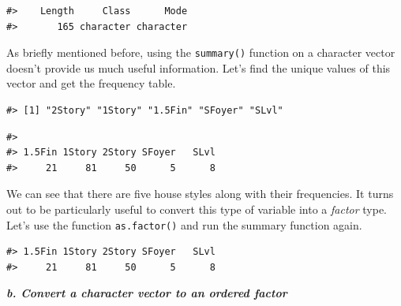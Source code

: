 \documentclass[
]{book}
\newenvironment{Shaded}{\begin{snugshade}}{\end{snugshade}}
\newcommand{\FunctionTok}[1]{\textcolor[rgb]{0.00,0.00,0.00}{#1}}
\newcommand{\NormalTok}[1]{#1}
\newcommand{\OtherTok}[1]{\textcolor[rgb]{0.56,0.35,0.01}{#1}}
\newcommand{\SpecialCharTok}[1]{\textcolor[rgb]{0.00,0.00,0.00}{#1}}
\begin{document}
\begin{verbatim}
#>    Length     Class      Mode 
#>       165 character character
\end{verbatim}

As briefly mentioned before, using the \texttt{summary()} function on a character vector doesn't provide us much useful information. Let's find the unique values of this vector and get the frequency table.

\begin{Shaded}
\end{Shaded}

\begin{verbatim}
#> [1] "2Story" "1Story" "1.5Fin" "SFoyer" "SLvl"
\end{verbatim}

\begin{Shaded}
\end{Shaded}

\begin{verbatim}
#> 
#> 1.5Fin 1Story 2Story SFoyer   SLvl 
#>     21     81     50      5      8
\end{verbatim}

We can see that there are five house styles along with their frequencies. It turns out to be particularly useful to convert this type of variable into a \emph{factor} type. Let's use the function \texttt{as.factor()} and run the summary function again.

\begin{Shaded}
\end{Shaded}

\begin{verbatim}
#> 1.5Fin 1Story 2Story SFoyer   SLvl 
#>     21     81     50      5      8
\end{verbatim}

\textbf{\emph{b. Convert a character vector to an ordered factor}}
\end{document}
